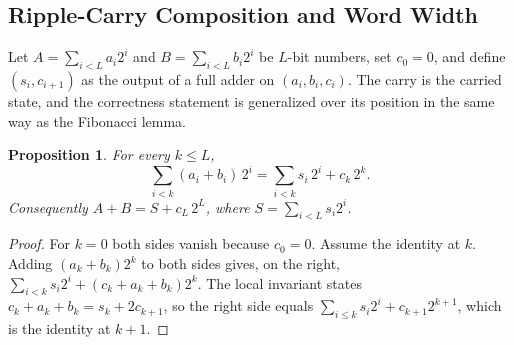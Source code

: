 \documentclass[11pt]{article}
\newtheorem{proposition}{Proposition}
\theoremstyle{definition}
\theoremstyle{remark}
\begin{document}
\subsection{Ripple-Carry Composition and Word Width}

Let $A = \sum_{i<L} a_i 2^{i}$ and $B = \sum_{i<L} b_i 2^{i}$ be $L$-bit numbers, set $c_0 = 0$, and define $(s_i, c_{i+1})$ as the output of a full adder on $(a_i, b_i, c_i)$. The carry is the carried state, and the correctness statement is generalized over its position in the same way as the Fibonacci lemma.

\begin{proposition}\label{prop:ripple}
For every $k \le L$,
\[
\sum_{i<k} (a_i + b_i)\,2^{i} = \sum_{i<k} s_i\,2^{i} + c_k\,2^{k} .
\]
Consequently $A + B = S + c_L\,2^{L}$, where $S = \sum_{i<L} s_i 2^{i}$.
\end{proposition}

\begin{proof}
For $k = 0$ both sides vanish because $c_0 = 0$. Assume the identity at $k$. Adding $(a_k + b_k)2^{k}$ to both sides gives, on the right, $\sum_{i<k} s_i 2^{i} + (c_k + a_k + b_k)2^{k}$. The local invariant states $c_k + a_k + b_k = s_k + 2c_{k+1}$, so the right side equals $\sum_{i\le k} s_i 2^{i} + c_{k+1}2^{k+1}$, which is the identity at $k+1$.
\end{proof}
\end{document}
